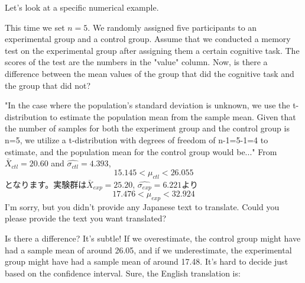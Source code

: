\documentclass{ltjsarticle}
\begin{document}
{%
Let's look at a specific numerical example.

This time we set $n=5$. We randomly assigned five participants to an experimental group and a control group. Assume that we conducted a memory test on the experimental group after assigning them a certain cognitive task. The scores of the test are the numbers in the "value" column. Now, is there a difference between the mean values of the group that did the cognitive task and the group that did not?

"In the case where the population's standard deviation is unknown, we use the t-distribution to estimate the population mean from the sample mean. Given that the number of samples for both the experiment group and the control group is n=5, we utilize a t-distribution with degrees of freedom of n-1=5-1=4 to estimate, and the population mean for the control group would be..."
From $\bar{X}_{ctl} =20.60$ and $\hat{\sigma_{ctl}}=4.393$,
\[15.145 < \mu_{ctl}<26.055 \]
となります。実験群は$\bar{X}_{exp} = 25.20$,
$\hat{\sigma_{exp}}=6.221$より
\[17.476<\mu_{exp}< 32.924 \]
I'm sorry, but you didn't provide any Japanese text to translate. Could you please provide the text you want translated?

Is there a difference? It's subtle! If we overestimate, the control group might have had a sample mean of around 26.05, and if we underestimate, the experimental group might have had a sample mean of around 17.48. It's hard to decide just based on the confidence interval.
Sure, the English translation is:

}
\end{document}
